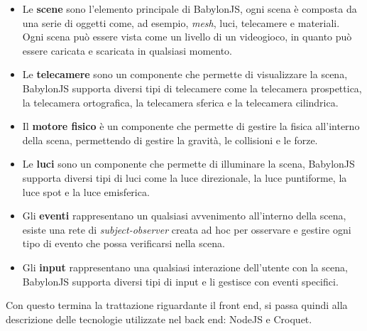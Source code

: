 \begin{itemize}
\begin{itemize}
        \item Le \textbf{scene} sono l'elemento principale di BabylonJS, ogni scena è composta da una serie di oggetti come, ad esempio, \textit{mesh}, luci, telecamere e materiali. Ogni scena
        può essere vista come un livello di un videogioco, in quanto può essere caricata e scaricata in qualsiasi momento.
        \item Le \textbf{telecamere} sono un componente che permette di visualizzare la scena, BabylonJS supporta diversi tipi di telecamere come la telecamera prospettica, la telecamera ortografica,
        la telecamera sferica e la telecamera cilindrica.
        \item Il \textbf{motore fisico} è un componente che permette di gestire la fisica all'interno della scena, permettendo di gestire la gravità, le collisioni e le forze.
        \item Le \textbf{luci} sono un componente che permette di illuminare la scena, BabylonJS supporta diversi tipi di luci come la luce direzionale, la luce puntiforme, la luce spot e la luce
        emisferica.
        \item Gli \textbf{eventi} rappresentano un qualsiasi avvenimento all'interno della scena, esiste una rete di \textit{subject-observer} creata ad hoc per osservare e gestire ogni tipo
        di evento che possa verificarsi nella scena.
        \item Gli \textbf{input} rappresentano una qualsiasi interazione dell'utente con la scena, BabylonJS supporta diversi tipi di input e li gestisce con eventi specifici.
    \end{itemize}
\end{itemize}
Con questo termina la trattazione riguardante il front end, si passa quindi alla descrizione delle tecnologie utilizzate nel back end: NodeJS e Croquet.

